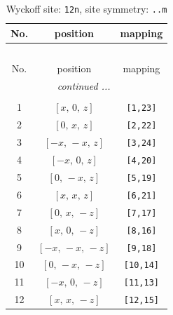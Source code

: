 \documentclass[fleqn,8pt]{jsarticle}
\begin{document}
\begin{longtable}{ccc}
\caption{Wyckoff site: {\tt 12n}, site symmetry: {\tt ..m}}
 \\
 \hline \hline
No. & position & mapping \\ \hline \endfirsthead

\multicolumn{2}{l}{\tablename\ \thetable{}} \\
 \hline \hline
No. & position & mapping \\ \hline \endhead

 \hline \hline
\multicolumn{2}{r}{\footnotesize\it continued ...} \\ \endfoot

 \hline \hline
\multicolumn{2}{r}{} \\ \endlastfoot

1 & $\left[ x,\, 0,\, z \right]$ & {\tt [1,23]} \\ \hline
2 & $\left[ 0,\, x,\, z \right]$ & {\tt [2,22]} \\ \hline
3 & $\left[ - x,\, - x,\, z \right]$ & {\tt [3,24]} \\ \hline
4 & $\left[ - x,\, 0,\, z \right]$ & {\tt [4,20]} \\ \hline
5 & $\left[ 0,\, - x,\, z \right]$ & {\tt [5,19]} \\ \hline
6 & $\left[ x,\, x,\, z \right]$ & {\tt [6,21]} \\ \hline
7 & $\left[ 0,\, x,\, - z \right]$ & {\tt [7,17]} \\ \hline
8 & $\left[ x,\, 0,\, - z \right]$ & {\tt [8,16]} \\ \hline
9 & $\left[ - x,\, - x,\, - z \right]$ & {\tt [9,18]} \\ \hline
10 & $\left[ 0,\, - x,\, - z \right]$ & {\tt [10,14]} \\ \hline
11 & $\left[ - x,\, 0,\, - z \right]$ & {\tt [11,13]} \\ \hline
12 & $\left[ x,\, x,\, - z \right]$ & {\tt [12,15]} \\
\end{longtable}
\renewcommand{\arraystretch}{1.2}
\end{document}
